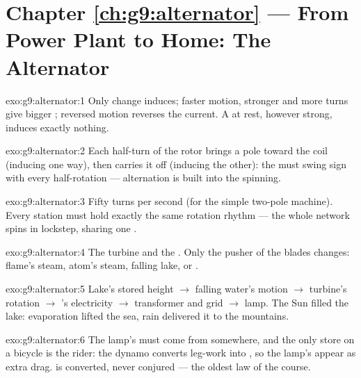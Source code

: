 \section*{Chapter \ref{ch:g9:alternator} --- From Power Plant to Home: The Alternator}

\begin{solution}{exo:g9:alternator:1}
Only change induces; faster motion, stronger  and more
turns give bigger ; reversed motion reverses the
current. A  at rest, however strong, induces exactly
nothing.
\end{solution}

\begin{solution}{exo:g9:alternator:2}
Each half-turn of the rotor brings a pole toward the coil
(inducing one way), then carries it off (inducing the other):
the  must swing sign with every half-rotation ---
alternation is built into the spinning.
\end{solution}

\begin{solution}{exo:g9:alternator:3}
Fifty turns per second (for the simple two-pole machine).
Every station must hold exactly the same rotation rhythm ---
the whole network spins in lockstep, sharing one .
\end{solution}

\begin{solution}{exo:g9:alternator:4}
The turbine and the . Only the pusher of the blades
changes: flame's steam, atom's steam, falling lake, or .
\end{solution}

\begin{solution}{exo:g9:alternator:5}
Lake's stored height $\to$ falling water's motion $\to$
turbine's rotation $\to$ 's electricity $\to$
transformer and grid $\to$ lamp. The Sun filled the lake:
evaporation lifted the sea, rain delivered it to the
mountains.
\end{solution}

\begin{solution}{exo:g9:alternator:6}
The lamp's  must come from somewhere, and the only
store on a bicycle is the rider: the dynamo converts leg-work
into , so the lamp's  appear as extra drag.
 is converted, never conjured --- the oldest law of
the course.
\end{solution}

